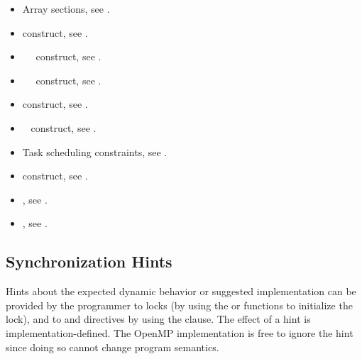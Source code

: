 \crossreferences
\begin{itemize}
\item Array sections, see
.

\item {} construct, see 
.

\item {}~~ construct, see 
.

\item {}~~ construct, see 
.

\item {} construct, see 
.

\item {}~ construct, see 
.

\item Task scheduling constraints, see
. 

\item {} construct, see
. 

\item {}, see
.

\item {}, see
.
\end{itemize}

\subsection{Synchronization Hints}
\label{subsec:Synchronization Hints}
Hints about the expected dynamic behavior or suggested implementation
can be provided by the programmer to locks (by using 
the  or
 functions to initialize the lock), and to
 and  directives by using the 
clause.  The effect of a hint is implementation-defined. The OpenMP
implementation is free to ignore the hint since doing so cannot change
program semantics.


